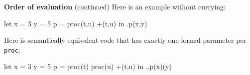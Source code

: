 \begin{minipage}[t]{\sw}
\slidenumber
\LARGE
{\bf Order of evaluation} (continued)\exx
Here is an example without currying:
\begin{qv}
let
  x = 3
  y = 5
  p = proc(t,u) +(t,u)
in
  .p(x,y) %
\end{qv}
Here is semantically equivalent code
that has exactly one formal parameter per \verb'proc':
\begin{qv}
let
  x = 3
  y = 5
  p = proc(t) proc(u) +(t,u)
in
  ..p(x)(y)
\end{qv}
\end{minipage}
\clearpage
